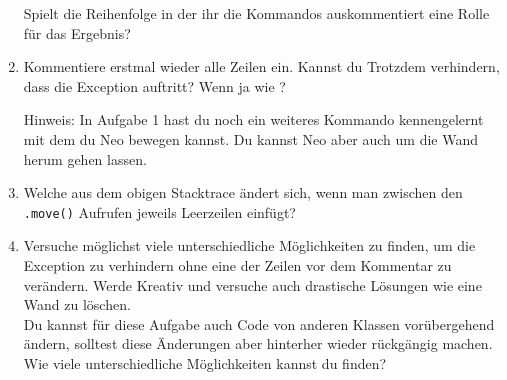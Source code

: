 \begin{enumerate}[label=\alph*)]
        Spielt die Reihenfolge in der ihr die Kommandos auskommentiert eine Rolle für das Ergebnis?
    \item Kommentiere erstmal wieder alle Zeilen ein.
        Kannst du Trotzdem verhindern, dass die Exception auftritt?
        Wenn ja wie ?

        Hinweis: In Aufgabe 1 hast du noch ein weiteres Kommando kennengelernt mit dem du Neo bewegen kannst.
        Du kannst Neo aber auch um die Wand herum gehen lassen.
    \item \optional Welche  aus dem obigen Stacktrace ändert sich, wenn man zwischen den \lstinline{.move()} Aufrufen jeweils Leerzeilen einfügt?
    \item \optional Versuche möglichst viele unterschiedliche Möglichkeiten zu finden, um die Exception zu verhindern ohne eine der Zeilen vor dem Kommentar zu verändern.
        Werde Kreativ und versuche auch drastische Lösungen wie eine Wand zu löschen.\\
        Du kannst für diese Aufgabe auch Code von anderen Klassen vorübergehend ändern, solltest diese Änderungen aber hinterher wieder rückgängig machen.
        Wie viele unterschiedliche Möglichkeiten kannst du finden?
\end{enumerate}
 
